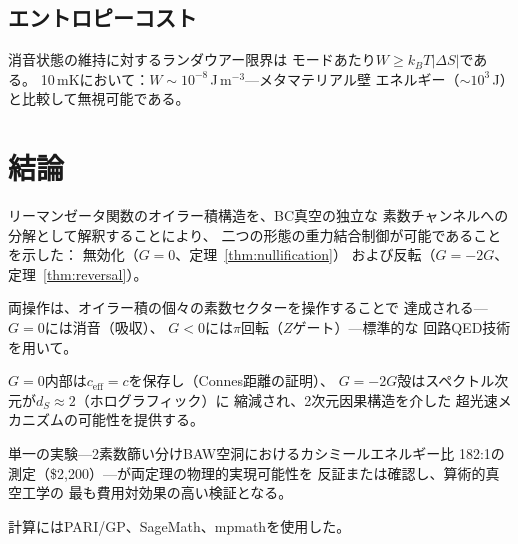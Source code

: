 \documentclass[a4paper,11pt]{article}
\begin{document}
\subsection{エントロピーコスト}

消音状態の維持に対するランダウアー限界は
モードあたり$W \geq k_B T |\Delta S|$である。
10\,mKにおいて：$W \sim 10^{-8}$\,J\,m$^{-3}$---メタマテリアル壁
エネルギー（$\sim 10^3$\,J）と比較して無視可能である。

\section{結論}

リーマンゼータ関数のオイラー積構造を、BC真空の独立な
素数チャンネルへの分解として解釈することにより、
二つの形態の重力結合制御が可能であることを示した：
無効化（$G = 0$、定理~\ref{thm:nullification}）
および反転（$G = -2G$、定理~\ref{thm:reversal}）。

両操作は、オイラー積の個々の素数セクターを操作することで
達成される---$G = 0$には消音（吸収）、
$G < 0$には$\pi$回転（$Z$ゲート）---標準的な
回路QED技術を用いて。

$G = 0$内部は$c_{\mathrm{eff}} = c$を保存し（Connes距離の証明）、
$G = -2G$殻はスペクトル次元が$d_S \approx 2$（ホログラフィック）に
縮減され、2次元因果構造を介した
超光速メカニズムの可能性を提供する。

単一の実験---2素数篩い分けBAW空洞におけるカシミールエネルギー比
182:1の測定（\$2{,}200）---が両定理の物理的実現可能性を
反証または確認し、算術的真空工学の
最も費用対効果の高い検証となる。

\begin{acknowledgments}
計算にはPARI/GP、SageMath、mpmathを使用した。
\end{acknowledgments}
\end{document}
